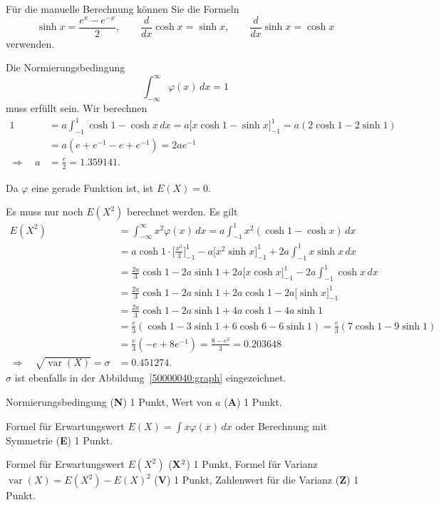 \begin{hinweis}
Für die manuelle Berechnung können Sie die Formeln
\[
\sinh x = \frac{e^x - e^{-x}}2,\qquad
\frac{d}{dx}\cosh x = \sinh x, \qquad
\frac{d}{dx}\sinh x = \cosh x
\]
verwenden.
\end{hinweis}

\begin{loesung}
\begin{teilaufgaben}
\item
Die Normierungsbedingung
\[
\int_{-\infty}^\infty \varphi(x)\,dx =1
\]
muss erfüllt sein.
Wir berechnen
\begin{align*}
1
&=
a\int_{-1}^1 \cosh 1 - \cosh x\,dx
=
a\biggl[ x \cosh 1 - \sinh x\biggr]_{-1}^1
=
a(2\cosh1 -2\sinh 1)
\\
&=
a(e + e^{-1} - e + e^{-1})
=
2ae^{-1}
\\
\Rightarrow\quad
a&=\frac{e}{2}=1.359141.
\end{align*}
\item
Da $\varphi$ eine gerade Funktion ist, ist $E(X)=0$.
\item
Es muss nur noch $E(X^2)$ berechnet werden.
Es gilt
\begin{align*}
E(X^2)
&=
\int_{-\infty}^\infty x^2\varphi(x)\,dx
=
a\int_{-1}^1 x^2 (\cosh 1 - \cosh x)\,dx
\\
&=
a\cosh 1\cdot \biggl[\frac{x^3}{3}\biggr]_{-1}^1
-
a\biggl[x^2\sinh x\biggr]_{-1}^{1}
+
2a\int_{-1}^1 x\sinh x\,dx
\\
&=
\frac{2a}{3}\cosh 1 - 2a\sinh 1
+2a\biggl[x\cosh x\biggr]_{-1}^1
-2a\int_{-1}^1 \cosh x\,dx
\\
&=
\frac{2a}{3}\cosh 1
 - 2a\sinh 1
+2a\cosh 1
-2a\biggl[\sinh x\biggr]_{-1}^1
\\
&=
\frac{2a}{3}\cosh 1
 - 2a\sinh 1
+4a\cosh 1
-4a\sinh 1
\\
&=
\frac{e}{3}
(\cosh 1 -3\sinh 1 + 6\cosh 6 - 6\sinh 1)
=
\frac{e}{3}(7\cosh 1 - 9 \sinh 1)
\\
&=
\frac{e}{3}(-e+8e^{-1})
=
\frac{8-e^2}{3}
=
0.203648
\\
\Rightarrow\quad
\sqrt{\operatorname{var}(X)}
=
\sigma
&=
0.451274.
\end{align*}
$\sigma$ ist ebenfalls in der Abbildung~\ref{50000040:graph} eingezeichnet.
\qedhere
\end{teilaufgaben}
\end{loesung}

\begin{bewertung}
\begin{teilaufgaben}
\item
Normierungsbedingung ({\bf N}) 1 Punkt,
Wert von $a$ ({\bf A}) 1 Punkt.
\item
Formel für Erwartungswert $E(X)=\int x\varphi(x)\,dx$
oder Berechnung mit Symmetrie ({\bf E}) 1 Punkt.
\item
Formel für Erwartungswert $E(X^2)$  ({\bf X$\mathstrut^2$}) 1 Punkt,
Formel für Varianz $\operatorname{var}(X) = E(X^2)-E(X)^2$ ({\bf V}) 1 Punkt,
Zahlenwert für die Varianz ({\bf Z}) 1 Punkt.
\end{teilaufgaben}
\end{bewertung}

